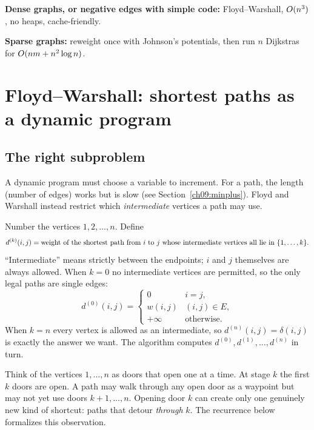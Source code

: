 \begin{intuitionbox}
\textbf{Dense graphs, or negative edges with simple code:}
Floyd--Warshall, $O(n^3)$, no heaps, cache-friendly.

\textbf{Sparse graphs:}
reweight once with Johnson's potentials, then run $n$ Dijkstras for $O(nm + n^2\log n)$.
\end{intuitionbox}

\section{Floyd--Warshall: shortest paths as a dynamic program}
\label{ch09:fw}

\subsection{The right subproblem}

A dynamic program must choose a variable to increment. For a path, the length (number of edges) works but is slow (see Section~\ref{ch09:minplus}). Floyd and Warshall instead restrict which \emph{intermediate} vertices a path may use.

Number the vertices $1,2,\dots,n$. Define
\[
  d^{(k)}(i,j) = \text{weight of the shortest path from } i \text{ to } j
  \text{ whose intermediate vertices all lie in } \{1,\dots,k\}.
\]
``Intermediate'' means strictly between the endpoints; $i$ and $j$ themselves are always allowed.
When $k=0$ no intermediate vertices are permitted, so the only legal paths are single edges:
\[
  d^{(0)}(i,j) = \begin{cases}
    0 & i=j,\\
    w(i,j) & (i,j)\in E,\\
    +\infty & \text{otherwise.}
  \end{cases}
\]
When $k=n$ every vertex is allowed as an intermediate, so $d^{(n)}(i,j)=\delta(i,j)$ is exactly the
answer we want. The algorithm computes $d^{(0)},d^{(1)},\dots,d^{(n)}$ in turn.

\begin{intuitionbox}
Think of the vertices $1,\dots,n$ as doors that open one at a time. At stage $k$ the first $k$ doors
are open. A path may walk through any open door as a waypoint but may not yet use doors
$k{+}1,\dots,n$. Opening door $k$ can create only one genuinely new kind of shortcut: paths that
detour \emph{through} $k$. The recurrence below formalizes this observation.
\end{intuitionbox}

